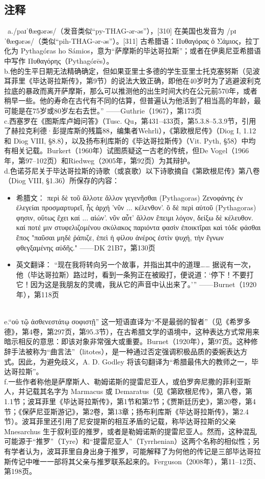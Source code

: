 \subsection{注释}\
a./paɪˈθæɡərəs/（发音类似“py-THAG-ər-əs”），[310] 在美国也发音为 /pɪˈθæɡərəs/（类似“pih-THAG-ər-əs”）。[311]  
古希腊语：Πυθαγόρας ὁ Σάμιος，拉丁化为 Pythagóras ho Sámios，意为“萨摩斯的毕达哥拉斯”；或者在伊奥尼亚希腊语中写作 Πυθαγόρης（Pythagórēs）。\\  
b.他的生平日期无法精确确定，但如果亚里士多德的学生亚里士托克塞努斯（见波耳菲里《毕达哥拉斯传》，第9节）的说法大致正确，即他在40岁时为了逃避波利克拉底的暴政而离开萨摩斯，那么可以推测他的出生时间大约在公元前570年，或者稍早一些。他的寿命在古代有不同的估算，但普遍认为他活到了相当高的年龄，最可能是在75岁或80岁左右去世。” ——Guthrie（1967），第173页\\  
c.西塞罗在《图斯库卢姆问答》（Tusc. Qu，第431–433页，第5.3.8–5.3.9节，引用了赫拉克利德·彭提库斯的残篇88，编集者Wehrli），《第欧根尼传》（Diog I, 1.12 和 Diog VIII, §8.8），以及扬布利库斯的《毕达哥拉斯传》（Vit. Pyth, §58）中均有相关记载。Burkert（1960年）试图质疑这一古老的传统，但De Vogel（1966年，第97–102页）和Riedweg（2005年，第92页）为其辩护。\\
d.色诺芬尼关于毕达哥拉斯的诗歌（或哀歌）以下诗歌摘自《第欧根尼传》第八卷（Diog VIII, §1.36）所保存的内容：  
\begin{itemize}
\item 希腊文：  
περὶ δὲ τοῦ ἄλλοτε ἄλλον γεγενῆσθαι (Pythagoras) Ζενοφάνης ἐν ἐλεγείαι προσμαρτυρεῖ, ἧς ἀρχή 'νῦν ... κέλενθον'.  
ὃ δὲ περὶ αὐτοῦ (Pythagoras) φησιν, οὕτως ἔχει καί ... αἰών'.  
νῦν αὖτ' ἄλλον ἔπειμι λόγον, δείξω δὲ κέλευθον.  
καί ποτέ μιν στυφελιζομένου σκύλακος παριόντα  
φασὶν ἐποικτῖραι καὶ τόδε φάσθαι ἔπος  
"παῦσαι μηδὲ ῥάπιζε, ἐπεὶ ἡ φίλου ἀνέρος ἐστὶν ψυχή,  
τὴν ἔγνων φθεγξαμένης αὐδῆς." ——DK 21B7，第130页  
\item 英文翻译：  
“现在我将转向另一个故事，并指出其中的道理……  
据说有一次，他（毕达哥拉斯）路过时，看到一条狗正在被殴打，便说道：‘停下！不要打它！因为这是我朋友的灵魂，我从它的声音中认出来了。’”  
——Burnet（1920年），第118页  
\end{itemize}\\
e.“οὐ τῷ ἀσθενεστάτῳ σοφιστῇ” 这一短语直译为“不是最弱的智者”（见《希罗多德》，第4卷，第297页，第95.3节），在古希腊文学的语境中，这种表达方式常用来暗示相反的意思：即该对象非常强大或重要。Burnet（1920年），第97页。这种修辞手法被称为“曲言法”（litotes），是一种通过否定强调积极品质的委婉表达方式。因此，为避免歧义，A. D. Godley 将该句翻译为“希腊最伟大的教师之一，毕达哥拉斯”。\\
f.一些作者称他是萨摩斯人、勒姆诺斯的提雷尼亚人，或伯罗奔尼撒的菲利亚斯人，并记载其名字为 Marmacus 或 Demaratus（见《第欧根尼传》，第八卷，第1.1节；波耳菲里《毕达哥拉斯传》，第1节和第2节；《贾斯廷历史》，第20卷，第4节；《保萨尼亚斯游记》，第2卷，第13章；扬布利库斯《毕达哥拉斯传》，第2.4节）。波耳菲里还引用了尼安提斯的相互矛盾的记载，称毕达哥拉斯的父亲 Mnesarchus 生于叙利亚的推罗，或者是勒姆诺斯的提雷尼亚人。然而，这种混乱可能源于“推罗”（Tyre）和“提雷尼亚人”（Tyrrhenian）这两个名称的相似性；另有学者认为，波耳菲里自身出身于推罗，可能解释了为何他的传记是三部毕达哥拉斯传记中唯一一部将其父亲与推罗联系起来的。Ferguson（2008年），第11–12页、第198页。

